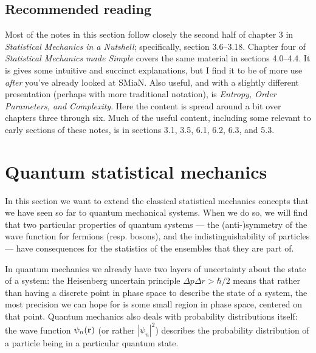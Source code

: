 \documentclass{article}
\begin{document}
\subsection*{Recommended reading}
Most of the notes in this section follow closely the second half of chapter 3 in \emph{Statistical Mechanics in a Nutshell}; specifically, section 3.6--3.18. Chapter four of \emph{Statistical Mechanics made Simple} covers the same material in sections 4.0--4.4. It is gives some intuitive and succinct explanations, but I find it to be of more use \emph{after} you've already looked at SMiaN. Also useful, and with a slightly different presentation (perhaps with more traditional notation), is \emph{Entropy, Order Parameters, and Complexity}. Here the content is spread around a bit over chapters three through six. Much of the useful content, including some relevant to early sections of these notes, is in sections 3.1, 3.5, 6.1, 6.2, 6.3, and 5.3.

\section*{Quantum statistical mechanics}

\newcommand{\bra}[1]{\langle #1 |}
\newcommand{\ket}[1]{| #1 \rangle}
\newcommand{\braket}[2]{\langle #1 | #2\rangle}

In this section we want to extend the classical statistical mechanics concepts that we have seen so far to quantum mechanical systems. When we do so, we will find that two particular properties of quantum systems --- the (anti-)symmetry of the wave function for fermions (resp. bosons), and the indistinguishability of particles --- have consequences for the statistics of the ensembles that they are part of.

In quantum mechanics we already have two layers of uncertainty about the state of a system: the Heisenberg uncertain principle $\Delta{p}\Delta {r}>{\hbar}/{2}$ means that rather than having a discrete point in phase space to describe the state of a system, the most precision we can hope for is some small region in phase space, centered on that point. Quantum mechanics also deals with probability distributions itself: the wave function $\psi_n({\bf r})$ (or rather $|\psi_n|^2$) describes the probability distribution of a particle being in a particular quantum state.
\end{document}
